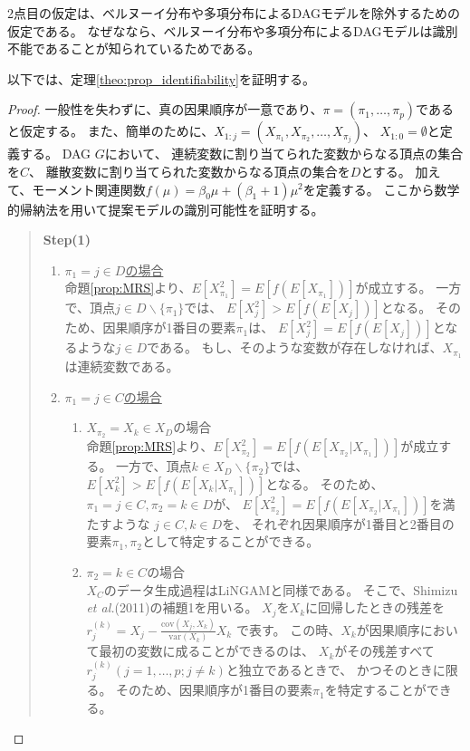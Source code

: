2点目の仮定は、ベルヌーイ分布や多項分布によるDAGモデルを除外するための仮定である。
なぜななら、ベルヌーイ分布や多項分布によるDAGモデルは識別不能であることが知られているためである\cite{Heckerman1995-es}。

以下では、定理\ref{theo:prop_identifiability}を証明する。

\begin{proof}
  一般性を失わずに、真の因果順序が一意であり、$\pi = (\pi_1, \dots, \pi_p)$であると仮定する。
  また、簡単のために、$X_{1:j} = (X_{\pi_1}, X_{\pi_2}, \dots, X_{\pi_j})$、
  $X_{1:0} = \emptyset$と定義する。
  DAG $G$において、
  連続変数に割り当てられた変数からなる頂点の集合を$C$、
  離散変数に割り当てられた変数からなる頂点の集合を$D$とする。
  加えて、モーメント関連関数$f(\mu) = \beta_0 \mu + (\beta_1 + 1)\mu^2$を定義する。
  ここから数学的帰納法を用いて提案モデルの識別可能性を証明する。

  \begin{quote}
    \textbf{Step(1)}
    \begin{enumerate}[label=(\roman*)]
      \item
      \underline{$\pi_1 = j \in D$の場合} \\
      命題\ref{prop:MRS}より、$E[X_{\pi_1}^2] = E[f(E[X_{\pi_1}])]$が成立する。
      一方で、頂点$j \in D \backslash \{\pi_1\}$では、
      $E[X_j^2] > E[f(E[X_j])]$となる。
      そのため、因果順序が1番目の要素$\pi_1$は、
      $E[X_j^2] = E[f(E[X_j])]$となるような$j \in D$である。
      もし、そのような変数が存在しなければ、$X_{\pi_1}$は連続変数である。

      \item
      \underline{$\pi_1 = j \in C$の場合}
      \begin{enumerate}[label=(ii - \alph*)]
        \item
        $X_{\pi_2} = X_k \in X_D$の場合 \\
        命題\ref{prop:MRS}より、$E[X_{\pi_2}^2] = E[f(E[X_{\pi_2} | X_{\pi_1}])]$が成立する。
        一方で、頂点$k \in X_D \backslash \{\pi_2\}$では、
        $E[X_k^2] > E[f(E[X_k | X_{\pi_1}])]$となる。
        そのため、$\pi_1 = j \in C, \pi_2 = k \in D$が、
        $E[X_{\pi_2}^2] = E[f(E[X_{\pi_2} | X_{\pi_1}])]$を満たすような
        $j \in C, k \in D$を、
        それぞれ因果順序が1番目と2番目の要素$\pi_1, \pi_2$として特定することができる。

        \item
        $\pi_2 = k \in C$の場合 \\
        $X_C$のデータ生成過程はLiNGAM\cite{Shimizu2006-yu}と同様である。
        そこで、Shimizu \textit{et al.}(2011)\cite{Shimizu2011-pd}の補題1を用いる。
        $X_j$を$X_k$に回帰したときの残差を
        $r_j^{(k)} = X_j - \frac{\text{cov}(X_j, X_k)}{\text{var}(X_k)} X_k$
        で表す。
        この時、$X_k$が因果順序において最初の変数に成ることができるのは、
        $X_k$がその残差すべて$r_j^{(k)} (j = 1,\dots,p; j \neq k)$と独立であるときで、
        かつそのときに限る。
        そのため、因果順序が1番目の要素$\pi_1$を特定することができる。


\end{enumerate}
\end{enumerate}
\end{quote}
\end{proof}
